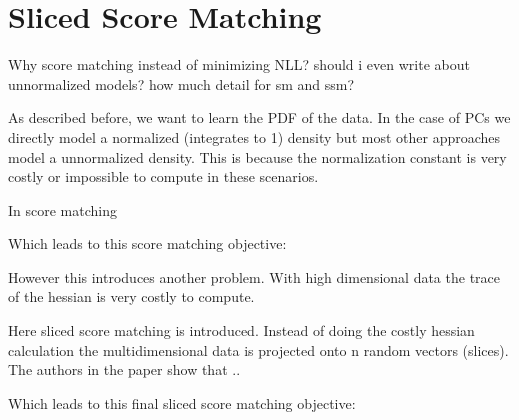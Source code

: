 \section{Sliced Score Matching}
\label{sec:ssm}

Why score matching instead of minimizing NLL? should i even write about unnormalized models?
how much detail for sm and ssm? 

As described before, we want to learn the PDF of the data. In the case of PCs we directly model a normalized (integrates to 1)
density but most other approaches model a unnormalized density. This is because the normalization constant is 
very costly or impossible to compute in these scenarios. 

In score matching \cite{score_matching} 

Which leads to this score matching objective: 



However this introduces another problem. With high dimensional data the trace of the hessian is very costly to compute.

Here sliced score matching \cite{sliced_score_matching} is introduced. Instead of doing the costly hessian calculation
the multidimensional data is projected onto n random vectors (slices). The authors in the paper show that ..

Which leads to this final sliced score matching objective: 








